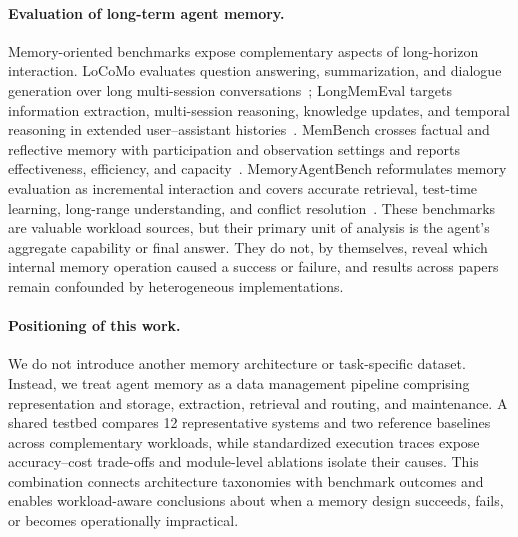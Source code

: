 \paragraph{Evaluation of long-term agent memory.}
Memory-oriented benchmarks expose complementary aspects of long-horizon interaction. LoCoMo evaluates question answering, summarization, and dialogue generation over long multi-session conversations~\citep{maharana2024locomo}; LongMemEval targets information extraction, multi-session reasoning, knowledge updates, and temporal reasoning in extended user--assistant histories~\citep{wu2024longmemeval}. MemBench crosses factual and reflective memory with participation and observation settings and reports effectiveness, efficiency, and capacity~\citep{membench}. MemoryAgentBench reformulates memory evaluation as incremental interaction and covers accurate retrieval, test-time learning, long-range understanding, and conflict resolution~\citep{memoryagentbench2026}. These benchmarks are valuable workload sources, but their primary unit of analysis is the agent's aggregate capability or final answer. They do not, by themselves, reveal which internal memory operation caused a success or failure, and results across papers remain confounded by heterogeneous implementations.

\paragraph{Positioning of this work.}
We do not introduce another memory architecture or task-specific dataset. Instead, we treat agent memory as a data management pipeline comprising representation and storage, extraction, retrieval and routing, and maintenance. A shared testbed compares 12 representative systems and two reference baselines across complementary workloads, while standardized execution traces expose accuracy--cost trade-offs and module-level ablations isolate their causes. This combination connects architecture taxonomies with benchmark outcomes and enables workload-aware conclusions about when a memory design succeeds, fails, or becomes operationally impractical.
